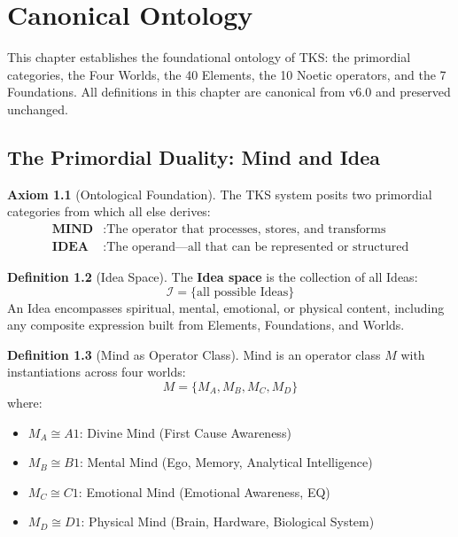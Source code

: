 \documentclass[11pt,twoside,openright]{book}
\theoremstyle{definition}
\newtheorem{definition}{Definition}[chapter]
\newtheorem{axiom}[definition]{Axiom}
\theoremstyle{plain}
\theoremstyle{remark}
\newcommand{\Ideas}{\mathcal{I}}
\begin{document}
\chapter{Canonical Ontology}
\label{ch:ontology}

This chapter establishes the foundational ontology of TKS: the primordial categories, the Four Worlds, the 40 Elements, the 10 Noetic operators, and the 7 Foundations. All definitions in this chapter are canonical from v6.0 and preserved unchanged.

\section{The Primordial Duality: Mind and Idea}

\begin{axiom}[Ontological Foundation]
\label{ax:ontological-foundation}
The TKS system posits two primordial categories from which all else derives:
\begin{align}
\textbf{MIND} &: \text{The operator that processes, stores, and transforms} \\
\textbf{IDEA} &: \text{The operand---all that can be represented or structured}
\end{align}
\end{axiom}

\begin{definition}[Idea Space]
\label{def:idea-space}
The \textbf{Idea space} is the collection of all Ideas:
\[
\Ideas = \{\text{all possible Ideas}\}
\]
An Idea encompasses spiritual, mental, emotional, or physical content, including any composite expression built from Elements, Foundations, and Worlds.
\end{definition}

\begin{definition}[Mind as Operator Class]
\label{def:mind-class}
Mind is an operator class $M$ with instantiations across four worlds:
\[
M = \{M_A, M_B, M_C, M_D\}
\]
where:
\begin{itemize}
  \item $M_A \cong A1$: Divine Mind (First Cause Awareness)
  \item $M_B \cong B1$: Mental Mind (Ego, Memory, Analytical Intelligence)
  \item $M_C \cong C1$: Emotional Mind (Emotional Awareness, EQ)
  \item $M_D \cong D1$: Physical Mind (Brain, Hardware, Biological System)
\end{itemize}
\end{definition}
\end{document}
